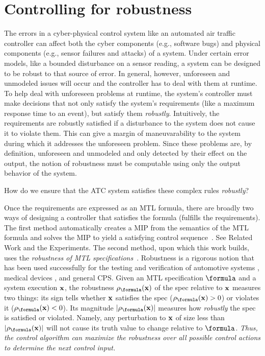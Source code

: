 \section{Controlling for robustness}
\label{sec:intro}
The errors in a cyber-physical control system like an automated air traffic controller can affect both the cyber components (e.g., software bugs) and physical components (e.g., sensor failures and attacks) of a system. 
Under certain error models, like a bounded disturbance on a sensor reading, a system can be designed to be robust to that source of error.
In general, however, unforeseen and unmodeled issues will occur and the controller has to deal with them at runtime. 
To help deal with unforeseen problems at runtime, the system's controller must make decisions that not only satisfy the system's requirements (like a maximum response time to an event), but satisfy them \textit{robustly}. 
Intuitively, the requirements are robustly satisfied if a disturbance to the system does not cause it to violate them.
This can give a margin of maneuvarability to the system during which it addresses the unforeseen problem.
Since these problems are, by definition, unforeseen and unmodeled and only detected by their effect on the output, the notion of robustness must be computable using only the output behavior of the system.



How do we ensure that the ATC system satisfies these complex rules \textit{robustly}?



Once the requirements are expressed as an MTL formula, there are broadly two ways of designing a controller that satisfies the formula (fulfills the requirements).
The first method automatically creates a MIP from the semantics of the MTL formula and solves the MIP to yield a satisfying control sequence~\cite{Raman14_MPCSTL,Saha_acc16}.
See Related Work and the Experiments.
The second method, upon which this work builds, uses the \textit{robustness of MTL specifications}~\cite{Fainekos2006_TLVerifSimu,Donze2010}.
Robustness is a rigorous notion that has been used successfully for the testing and verification of automotive systems \cite{Fainekos12_Automotive,Dreossi15_RRTFalsification}, medical devices \cite{SankaranarayananF2012cmsb}, and general CPS.
Given an MTL specification $\formula$ and a system execution $\mathbf{x}$, the robustness $\robf(\sstraj)$ of the spec relative to $\mathbf{x}$ measures two things:
its sign tells whether $\mathbf{x}$ satisfies the spec ($\robf(\sstraj) > 0$) or violates it ($\robf(\sstraj) <0$).
Its magnitude $|\robf(\sstraj)|$ measures how \textit{robustly} the spec is satisfied or violated.
Namely, any perturbation to $\mathbf{x}$ of size less than $|\robf(\sstraj)|$ will not cause its truth value to change relative to $\formula$.
\textit{Thus, the control algorithm can \textit{maximize} the robustness over all possible control actions to determine the next control input.}

